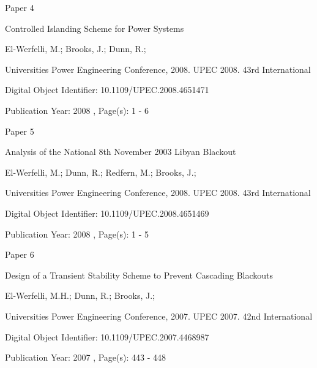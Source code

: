 \documentclass[a4paper,oneside,12pt]{report}
\begin{document}
\begin{center}\begin{large}
{\Huge Paper 4}
\vspace{40px}

Controlled Islanding Scheme for Power Systems
\vspace{40px}

El-Werfelli, M.; Brooks, J.; Dunn, R.;
\vspace{40px}

Universities Power Engineering Conference, 2008. UPEC 2008. 43rd International
\vspace{40px}

Digital Object Identifier: 10.1109/UPEC.2008.4651471

Publication Year: 2008 , Page(s): 1 - 6
\end{large}\end{center}




\begin{center}\begin{large}
{\Huge Paper 5}
\vspace{40px}

Analysis of the National 8th November 2003 Libyan Blackout
\vspace{40px}

El-Werfelli, M.; Dunn, R.; Redfern, M.; Brooks, J.;
\vspace{40px}

Universities Power Engineering Conference, 2008. UPEC 2008. 43rd International
\vspace{40px}

Digital Object Identifier: 10.1109/UPEC.2008.4651469

Publication Year: 2008 , Page(s): 1 - 5
\end{large}\end{center}




\begin{center}\begin{large}
{\Huge Paper 6}
\vspace{40px}

Design of a Transient Stability Scheme to Prevent Cascading Blackouts
\vspace{40px}

El-Werfelli, M.H.; Dunn, R.; Brooks, J.;
\vspace{40px}

Universities Power Engineering Conference, 2007. UPEC 2007. 42nd International
\vspace{40px}

Digital Object Identifier: 10.1109/UPEC.2007.4468987

Publication Year: 2007 , Page(s): 443 - 448
\end{large}\end{center}
\end{document}
